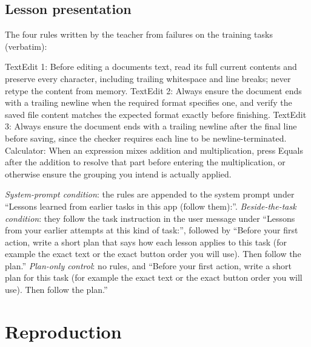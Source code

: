 \documentclass[
  10pt,
]{article}
\newenvironment{Shaded}{}{}
\newcommand{\NormalTok}[1]{#1}
\begin{document}
\subsection{Lesson presentation}\label{lesson-presentation}

The four rules written by the teacher from failures on the training
tasks (verbatim):

\begin{Shaded}
\begin{Highlighting}[]
\NormalTok{TextEdit 1: Before editing a document\textquotesingle{}s text, read its full current contents and preserve}
\NormalTok{  every character, including trailing whitespace and line breaks; never retype the content}
\NormalTok{  from memory.}
\NormalTok{TextEdit 2: Always ensure the document ends with a trailing newline when the required format}
\NormalTok{  specifies one, and verify the saved file content matches the expected format exactly}
\NormalTok{  before finishing.}
\NormalTok{TextEdit 3: Always ensure the document ends with a trailing newline after the final line}
\NormalTok{  before saving, since the checker requires each line to be newline{-}terminated.}
\NormalTok{Calculator: When an expression mixes addition and multiplication, press Equals after the}
\NormalTok{  addition to resolve that part before entering the multiplication, or otherwise ensure}
\NormalTok{  the grouping you intend is actually applied.}
\end{Highlighting}
\end{Shaded}

\emph{System-prompt condition}: the rules are appended to the system
prompt under ``Lessons learned from earlier tasks in this app (follow
them):''. \emph{Beside-the-task condition}: they follow the task
instruction in the user message under ``Lessons from your earlier
attempts at this kind of task:'', followed by ``Before your first
action, write a short plan that says how each lesson applies to this
task (for example the exact text or the exact button order you will
use). Then follow the plan.'' \emph{Plan-only control}: no rules, and
``Before your first action, write a short plan for this task (for
example the exact text or the exact button order you will use). Then
follow the plan.''

\section{Reproduction}\label{reproduction}
\end{document}
